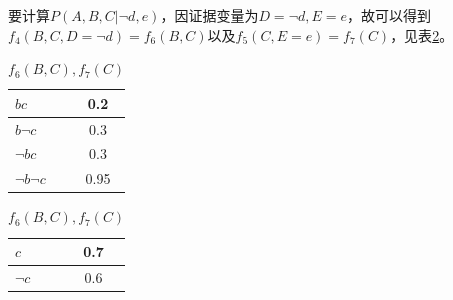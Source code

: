 \documentclass[a4paper, 11pt]{article}
\begin{document}
\begin{enumerate}
\begin{enumerate}[(a)]
      要计算$P(A,B,C|\lnot d,e)$，因证据变量为$D=\lnot d, E=e$，故可以得到$f_4(B,C,D=\lnot d)=f_6(B,C)$以及$f_5(C,E=e)=f_7(C)$，见表\ref{Q3T6}。
      \begin{table}[htbp]
        \centering
        \begin{tabular}{|l|c|}
          \hline
          $bc$&0.2\\
          \hline
          $b\lnot c$&0.3\\
          \hline
          $\lnot bc$&0.3\\
          \hline
          $\lnot b\lnot c$&0.95\\
          \hline
        \end{tabular}
        \begin{tabular}{|l|c|}
          \hline
          $c$&0.7\\
          \hline
          $\lnot c$&0.6\\
          \hline
        \end{tabular}
        \caption{$f_6(B,C),f_7(C)$}
        \label{Q3T6}
      \end{table}


\end{enumerate}
\end{enumerate}
\end{document}
